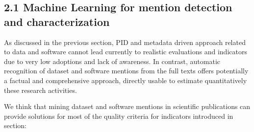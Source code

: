\documentclass[
]{article}
\begin{document}
\hypertarget{machine-learning-for-mention-detection-and-characterization}{%
\subsection{2.1 Machine Learning for mention detection and
characterization}\label{machine-learning-for-mention-detection-and-characterization}}

As discussed in the previous section, PID and metadata driven approach
related to data and software cannot lead currently to realistic
evaluations and indicators due to very low adoptions and lack of
awareness. In contrast, automatic recognition of dataset and software
mentions from the full texts offers potentially a factual and
comprehensive approach, directly usable to estimate quantitatively these
research activities.

We think that mining dataset and software mentions in scientific
publications can provide solutions for most of the quality criteria for
indicators introduced in section:
\end{document}
